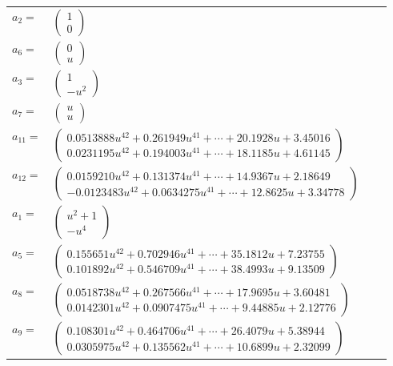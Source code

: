 \documentclass[1p]{elsarticle_modified}
\theoremstyle{definition}
\begin{document}
\begin{tabular}{m{7pt} m{180pt} m{7pt} m{180pt} }
\flushright $a_{2}=$&$\begin{pmatrix}1\\0\end{pmatrix}$ \\
\flushright $a_{6}=$&$\begin{pmatrix}0\\u\end{pmatrix}$ \\
\flushright $a_{3}=$&$\begin{pmatrix}1\\- u^2\end{pmatrix}$ \\
\flushright $a_{7}=$&$\begin{pmatrix}u\\u\end{pmatrix}$ \\
\flushright $a_{11}=$&$\begin{pmatrix}0.0513888 u^{42}+0.261949 u^{41}+\cdots+20.1928 u+3.45016\\0.0231195 u^{42}+0.194003 u^{41}+\cdots+18.1185 u+4.61145\end{pmatrix}$ \\
\flushright $a_{12}=$&$\begin{pmatrix}0.0159210 u^{42}+0.131374 u^{41}+\cdots+14.9367 u+2.18649\\-0.0123483 u^{42}+0.0634275 u^{41}+\cdots+12.8625 u+3.34778\end{pmatrix}$ \\
\flushright $a_{1}=$&$\begin{pmatrix}u^2+1\\- u^4\end{pmatrix}$ \\
\flushright $a_{5}=$&$\begin{pmatrix}0.155651 u^{42}+0.702946 u^{41}+\cdots+35.1812 u+7.23755\\0.101892 u^{42}+0.546709 u^{41}+\cdots+38.4993 u+9.13509\end{pmatrix}$ \\
\flushright $a_{8}=$&$\begin{pmatrix}0.0518738 u^{42}+0.267566 u^{41}+\cdots+17.9695 u+3.60481\\0.0142301 u^{42}+0.0907475 u^{41}+\cdots+9.44885 u+2.12776\end{pmatrix}$ \\
\flushright $a_{9}=$&$\begin{pmatrix}0.108301 u^{42}+0.464706 u^{41}+\cdots+26.4079 u+5.38944\\0.0305975 u^{42}+0.135562 u^{41}+\cdots+10.6899 u+2.32099\end{pmatrix}$ \\

\end{tabular}
\end{document}
